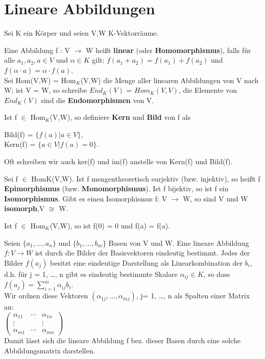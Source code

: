 \chapter{Lineare Abbildungen}

\begin{definition}
Sei K ein Körper und seien V,W K-Vektorräume.
\begin{compactenum}
\item Eine Abbildung f : V $\to$ W heißt \textbf{linear} (oder \textbf{Homomorphismus}), falls für alle $a_1, a_2, a \in V$ und $\alpha \in K$ gilt:
$f (a_1 + a_2) = f (a_1) + f (a_2)$ und $f (\alpha \cdot a) = \alpha \cdot f (a)$.\\
Sei Hom(V,W) = Hom$_K$(V,W) die Menge aller linearen Abbildungen von V nach W; ist V = W, so schreibe $End_K(V )$ = $Hom_K(V,V)$, die Elemente von $End_K(V)$ sind die \textbf{Endomorphismen} von V.
\item Ist f $\in$ Hom$_K$(V,W), so definiere \textbf{Kern} und \textbf{Bild} von f als
\begin{center}
Bild(f) = $\{ f (a) | a \in V\}$,\\
Kern(f) = $\{ a \in V | f(a) = 0\}$.
\end{center}
Oft schreiben wir auch ker(f) und im(f) anstelle von Kern(f) und Bild(f).
\item Sei f $\in$ HomK(V,W). Ist f mengentheoretisch surjektiv (bzw. injektiv), so heißt f \textbf{Epimorphismus} (bzw. \textbf{Monomorphismus}). Ist f bijektiv, so ist f ein \textbf{Isomorphismus}. Gibt es einen Isomorphismus f: V $\to$ W, so sind V und W \textbf{isomorph},V $\cong$ W.
\end{compactenum}
Ist f $\in$ Hom$_K$(V,W), so ist f(0) = 0 und f(a) = f(a).
\end{definition}

\begin{remark}
Seien $\{a_1, …, a_n\}$ und $\{b_1, …, b_m\}$ Basen von V und W. Eine lineare Abbildung $f: V \to W$ ist durch die Bilder der Basisvektoren eindeutig bestimmt. Jedes der Bilder $f(a_j)$ besitzt eine eindeutige Darstellung als Linearkombination der $b_i$, d.h. für j = 1, …, n gibt es eindeutig bestimmte Skalare $\alpha_{ij} \in K$, so dass $f(a_j) = \sum\limits_{i=1}^m \alpha_{ij}b_i$.\\
Wir ordnen diese Vektoren $(\alpha_{1j}, …, \alpha_{mj})$, j= 1, …, n als Spalten einer Matrix an:\\
$\begin{pmatrix} \alpha_{11} & \cdots & \alpha_{1n} \\ \vdots & & \vdots \\ \alpha_{m1} & \cdots & \alpha_{mn} \end{pmatrix}$\\
Damit lässt sich die lineare Abbildung f bez. dieser Basen durch eine solche Abbildungsmatrix darstellen.
\end{remark}

